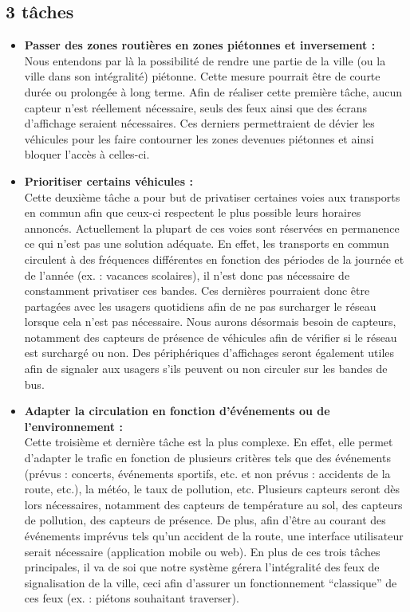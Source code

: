 \subsection{3 tâches}
\begin{itemize}
    \item \textbf{Passer des zones routières en zones piétonnes et inversement :}\\
    Nous entendons par là la possibilité de rendre une partie de la ville (ou la ville dans son intégralité) piétonne. Cette mesure pourrait être de courte durée ou prolongée à long terme. Afin de réaliser cette première tâche, aucun capteur n’est réellement nécessaire, seuls des feux ainsi que des écrans d’affichage seraient nécessaires. Ces derniers permettraient de dévier les véhicules pour les faire contourner les zones devenues piétonnes et ainsi bloquer l’accès à celles-ci.
    \item \textbf{Prioritiser certains véhicules :}\\
    Cette deuxième tâche a pour but de privatiser certaines voies aux transports en commun afin que ceux-ci respectent le plus possible leurs horaires annoncés. Actuellement la plupart de ces voies sont réservées en permanence ce qui n’est pas une solution adéquate. En effet, les transports en commun circulent à des fréquences différentes en fonction des périodes de la journée et de l’année (ex. : vacances scolaires), il n’est donc pas nécessaire de constamment privatiser ces bandes. Ces dernières pourraient donc être partagées avec les usagers quotidiens afin de ne pas surcharger le réseau lorsque cela n’est pas nécessaire. Nous aurons désormais besoin de capteurs, notamment des capteurs de présence de véhicules afin de vérifier si le réseau est surchargé ou non. Des périphériques d’affichages seront également utiles afin de signaler aux usagers s’ils peuvent ou non circuler sur les bandes de bus.
    \item \textbf{Adapter la circulation en fonction d'événements ou de l’environnement :}\\
    Cette troisième et dernière tâche est la plus complexe. En effet, elle permet d’adapter le trafic en fonction de plusieurs critères tels que des événements (prévus : concerts, événements sportifs, etc. et non prévus : accidents de la route, etc.), la météo, le taux de pollution, etc. Plusieurs capteurs seront dès lors nécessaires, notamment des capteurs de température au sol, des capteurs de pollution, des capteurs de présence. De plus, afin d’être au courant des événements imprévus tels qu’un accident de la route, une interface utilisateur serait nécessaire (application mobile ou web). En plus de ces trois tâches principales, il va de soi que notre système gérera l’intégralité des feux de signalisation de la ville, ceci afin d’assurer un fonctionnement “classique” de ces feux (ex. : piétons souhaitant traverser).
\end{itemize}